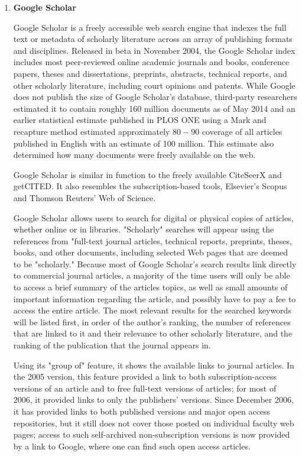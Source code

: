\begin{enumerate}
	\item\textbf{Google Scholar}
	\setlength{\parindent}{1em}
	
	Google Scholar is a freely accessible web search engine that indexes the full text or metadata of scholarly literature across an array of publishing formats and disciplines. Released in beta in November 2004, the Google Scholar index includes most peer-reviewed online academic journals and books, conference papers, theses and dissertations, preprints, abstracts, technical reports, and other scholarly literature, including court opinions and patents. While Google does not publish the size of Google Scholar's database, third-party researchers estimated it to contain roughly 160 million documents as of May 2014 and an earlier statistical estimate published in PLOS ONE using a Mark and recapture method estimated approximately $80-90$ coverage of all articles published in English with an estimate of 100 million. This estimate also determined how many documents were freely available on the web.
	
	Google Scholar is similar in function to the freely available CiteSeerX and getCITED. It also resembles the subscription-based tools, Elsevier's Scopus and Thomson Reuters' Web of Science.
	
	Google Scholar allows users to search for digital or physical copies of articles, whether online or in libraries. "Scholarly" searches will appear using the references from "full-text journal articles, technical reports, preprints, theses, books, and other documents, including selected Web pages that are deemed to be "scholarly." Because most of Google Scholar's search results link directly to commercial journal articles, a majority of the time users will only be able to access a brief summary of the articles topics, as well as small amounts of important information regarding the article, and possibly have to pay a fee to access the entire article. The most relevant results for the searched keywords will be listed first, in order of the author's ranking, the number of references that are linked to it and their relevance to other scholarly literature, and the ranking of the publication that the journal appears in.
	
	Using its "group of" feature, it shows the available links to journal articles. In the 2005 version, this feature provided a link to both subscription-access versions of an article and to free full-text versions of articles; for most of 2006, it provided links to only the publishers' versions. Since December 2006, it has provided links to both published versions and major open access repositories, but it still does not cover those posted on individual faculty web pages; access to such self-archived non-subscription versions is now provided by a link to Google, where one can find such open access articles.
	

\end{enumerate}
